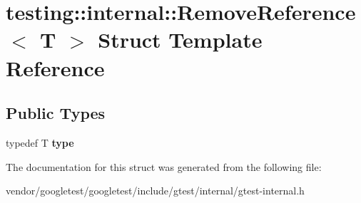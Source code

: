 \hypertarget{structtesting_1_1internal_1_1_remove_reference}{}\section{testing\+:\+:internal\+:\+:Remove\+Reference$<$ T $>$ Struct Template Reference}
\label{structtesting_1_1internal_1_1_remove_reference}
\subsection*{Public Types}
\begin{DoxyCompactItemize}
\item 
\mbox{\label{structtesting_1_1internal_1_1_remove_reference_a9ca4f6499579225f7986b789ee4b2895}} 
typedef T {\bfseries type}
\end{DoxyCompactItemize}


The documentation for this struct was generated from the following file\+:\begin{DoxyCompactItemize}
\item 
vendor/googletest/googletest/include/gtest/internal/gtest-\/internal.\+h\end{DoxyCompactItemize}
